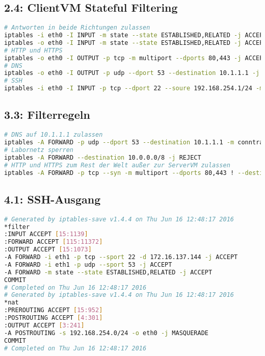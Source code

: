 \documentclass[twoside]{article}
\begin{document}
	\subsection*{2.4: ClientVM Stateful Filtering}
	\label{2.4-1}
	\begin{lstlisting}[language=bash]
# Antworten in beide Richtungen zulassen
iptables -i eth0 -I INPUT -m state --state ESTABLISHED,RELATED -j ACCEPT
iptables -o eth0 -I INPUT -m state --state ESTABLISHED,RELATED -j ACCEPT
# HTTP und HTTPS
iptables -o eth0 -I OUTPUT -p tcp -m multiport --dports 80,443 -j ACCEPT
# DNS
iptables -o eth0 -I OUTPUT -p udp --dport 53 --destination 10.1.1.1 -j ACCEPT
# SSH
iptables -i eth0 -I INPUT -p tcp --dport 22 --soure 192.168.254.1/24 -m conntrack --cstate NEW -j ACCEPT
	\end{lstlisting}
	\subsection*{3.3: Filterregeln}
	\label{3.3-1}
	\begin{lstlisting}[language=bash]
# DNS auf 10.1.1.1 zulassen
iptables -A FORWARD -p udp --dport 53 --destination 10.1.1.1 -m conntrack --cstate NEW -j ACCEPT
# Labornetz sperren
iptables -A FORWARD --destination 10.0.0.0/8 -j REJECT
# HTTP und HTTPS zum Rest der Welt außer zur ServerVM zulassen
iptables -A FORWARD -p tcp --syn -m multiport --dports 80,443 ! --destination 172.16.137.144 -m --conntrack --cstate NEW -j ACCEPT
	\end{lstlisting}
	\subsection*{4.1: SSH-Ausgang}
	\label{a4-1}
	\begin{lstlisting}[language=bash]
# Generated by iptables-save v1.4.4 on Thu Jun 16 12:48:17 2016
*filter
:INPUT ACCEPT [15:1139]
:FORWARD ACCEPT [115:11372]
:OUTPUT ACCEPT [15:1073]
-A FORWARD -i eth1 -p tcp --sport 22 -d 172.16.137.144 -j ACCEPT
-A FORWARD -i eth1 -p udp --sport 53 -j ACCEPT
-A FORWARD -m state --state ESTABLISHED,RELATED -j ACCEPT
COMMIT
# Completed on Thu Jun 16 12:48:17 2016
# Generated by iptables-save v1.4.4 on Thu Jun 16 12:48:17 2016
*nat
:PREROUTING ACCEPT [15:952]
:POSTROUTING ACCEPT [4:301]
:OUTPUT ACCEPT [3:241]
-A POSTROUTING -s 192.168.254.0/24 -o eth0 -j MASQUERADE 
COMMIT
# Completed on Thu Jun 16 12:48:17 2016
	\end{lstlisting}
\end{document}
